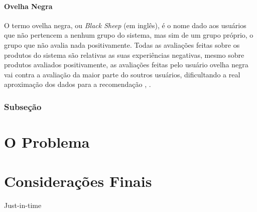 \documentclass[12pt,
				openright,
				twoside,
				a4paper,
				apter=TITLE,
				section=TITLE,
				subsection=TITLE,
				chapter=TITLE,
				english,
				brazil]{abntex2}
\begin{document}
\subsubsection{Ovelha Negra}
O termo ovelha negra, ou \textit{Black Sheep} (em inglês), é o nome dado aos usuários que não pertencem a nenhum grupo do sistema, mas sim de um grupo próprio, o grupo que não avalia nada positivamente. Todas as avaliações feitas sobre os produtos do sistema são relativas as suas experiências negativas, mesmo sobre produtos avaliados positivamente, as avaliações feitas pelo usuário ovelha negra vai contra a avaliação da maior parte do soutros usuários, dificultando a real aproximação dos dados para a recomendação \cite{de2009preference}, \cite{su2009survey}. 



\subsection{Subseção}


\chapter{O Problema}
\chapter{Considerações Finais}
Just-in-time



\end{document}
